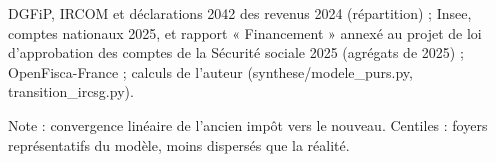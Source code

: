 DGFiP, IRCOM et déclarations 2042 des revenus 2024 (répartition) ; Insee, comptes nationaux 2025, et rapport « Financement » annexé au projet de loi d'approbation des comptes de la Sécurité sociale 2025 (agrégats de 2025) ; OpenFisca-France ; calculs de l'auteur (synthese/modele\_purs.py, transition\_ircsg.py).\par Note : convergence linéaire de l'ancien impôt vers le nouveau. Centiles : foyers représentatifs du modèle, moins dispersés que la réalité.
